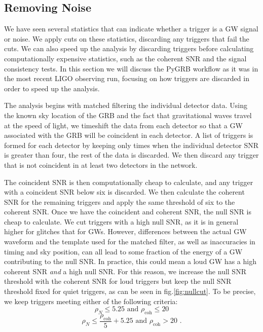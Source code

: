 \documentclass[11pt]{cuthesis}
\newcommand{\fs}{\text{ .}}
\begin{document}
\subsection{Removing Noise} \label{sec:thresholds}
We have seen several statistics that can indicate whether a trigger is a GW signal or noise. We apply cuts on these statistics, discarding any triggers that fail the cuts. We can also speed up the analysis by discarding triggers before calculating computationally expensive statistics, such as the coherent SNR and the signal consistency tests. In this section we will discuss the PyGRB workflow as it was in the most recent LIGO observing run, focusing on how triggers are discarded in order to speed up the analysis.

The analysis begins with matched filtering the individual detector data. Using the known sky location of the GRB and the fact that gravitational waves travel at the speed of light, we timeshift the data from each detector so that a GW associated with the GRB will be coincident in each detector. A list of triggers is formed for each detector by keeping only times when the individual detector SNR is greater than four, the rest of the data is discarded. We then discard any trigger that is not coincident in at least two detectors in the network. 

The coincident SNR is then computationally cheap to calculate, and any trigger with a coincident SNR below six is discarded. We then calculate the coherent SNR for the remaining triggers and apply the same threshold of six to the coherent SNR. Once we have the coincident and coherent SNR, the null SNR is cheap to calculate. We cut triggers with a high null SNR, as it is in general higher for glitches that for GWs. However, differences between the actual GW waveform and the template used for the matched filter, as well as inaccuracies in timing and sky position, can all lead to some fraction of the energy of a GW contributing to the null SNR. In practice, this could mean a loud GW has a high coherent SNR \textit{and} a high null SNR. For this reason, we increase the null SNR threshold with the coherent SNR for loud triggers but keep the null SNR threshold fixed for quiet triggers, as can be seen in fig.\ref{fig:nullcut}. To be precise, we keep triggers meeting either of the following criteria: 
\begin{equation}
\rho_N\leq5.25 \text{  and   } \rho_\text{coh}\leq 20
\end{equation} 
\begin{equation}
\rho_N \leq \frac{\rho_\text{coh}}{5}+5.25  \text{  and   } \rho_\text{coh}> 20 \fs
\end{equation}
\end{document}
